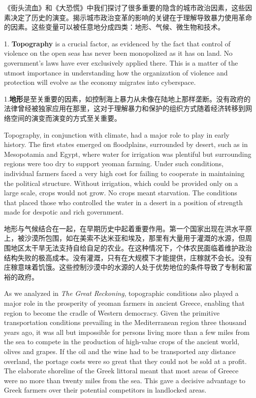\begin{Parallel}{97mm}{72mm}
  \ParallelRText
  {《街头流血》和《大恐慌》中我们探讨了很多重要的隐含的城市政治因素，这些因素决定了历史的演变。揭示城市政治变革的影响的关键在于理解导致暴力使用革命的因素。这些变量可以被任意地分成四类：地形、气候、微生物和技术。}
  \ParallelPar



  \ParallelLText
  {1. \textbf{Topography} is a crucial factor, as evidenced by the fact that control of violence on the open seas has never been monopolized as it has on land. No government's laws have ever exclusively applied there. This is a matter of the utmost importance in understanding how the organization of violence and protection will evolve as the economy migrates into cyberspace.}
  
  \ParallelRText
  {1.\textbf{地形}是至关重要的因素，如控制海上暴力从未像在陆地上那样垄断。没有政府的法律曾经被独家应用在那里，这对于理解暴力和保护的组织方式随着经济转移到网络空间的演变而演变的方式至关重要。}
  \ParallelPar


  \ParallelLText
  {Topography, in conjunction with climate, had a major role to play in early history. The first states emerged on floodplains, surrounded by desert, such as in Mesopotamia and Egypt, where water for irrigation was plentiful but surrounding regions were too dry to support yeoman farming. Under such conditions, individual farmers faced a very high cost for failing to cooperate in maintaining the political structure. Without irrigation, which could be provided only on a large scale, crops would not grow. No crops meant starvation. The conditions that placed those who controlled the water in a desert in a position of strength made for despotic and rich government.}
  
  \ParallelRText
  {地形与气候结合在一起，在早期历史中起着重要作用。第一个国家出现在洪水平原上，被沙漠所包围，如在美索不达米亚和埃及，那里有大量用于灌溉的水源，但周围地区太干旱无法支持自给自足的农业。在这种情况下，个体农民面临着维护政治结构失败的极高成本。没有灌溉，只有在大规模下才能提供，庄稼就不会长。没有庄稼意味着饥饿。这些控制沙漠中的水源的人处于优势地位的条件导致了专制和富裕的政府。}
  \ParallelPar


  \ParallelLText
  {As we analyzed in \emph{The Great Reckoning}, topographic conditions also played a major role in the prosperity of yeoman farmers in ancient Greece, enabling that region to become the cradle of Western democracy. Given the primitive transportation conditions prevailing in the Mediterranean region three thousand years ago, it was all but impossible for persons living more than a few miles from the sea to compete in the production of high-value crops of the ancient world, olives and grapes. If the oil and the wine had to be transported any distance overland, the portage costs were so great that they could not be sold at a profit. The elaborate shoreline of the Greek littoral meant that most areas of Greece were no more than twenty miles from the sea. This gave a decisive advantage to Greek farmers over their potential competitors in landlocked areas.}
  

\end{Parallel}
